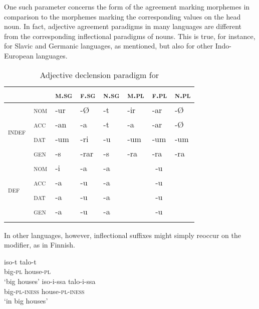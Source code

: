 One such parameter concerns the form of the agreement marking morphemes in comparison to the morphemes marking the corresponding values on the head noun. In fact, adjective agreement paradigms in many languages are different from the corresponding inflectional paradigms of nouns. This is true, for instance, for Slavic and Germanic languages, as mentioned, but also for other Indo-European languages. 
\begin{table}
\begin{tabular}{l l  l l l  l l l}
\lsptoprule
		&		&\textsc{m.sg}&\textsc{f.sg}&\textsc{n.sg}&\textsc{m.pl}&\textsc{f.pl}&\textsc{n.pl}\\
\midrule
		\multirow{4}{*}{\textsc{indef}} 	
		&\textsc{nom}	&-ur		&-Ø		&-t		&-ir		&-ar		&-Ø \\
		&\textsc{acc}	&-an		&-a		&-t		&-a		&-ar		&-Ø \\
		&\textsc{dat}	&-um	&-ri		&-u		&-um	&-um	&-um\\
		&\textsc{gen}	&-s		&-rar		&-s		&-ra		&-ra		&-ra\\
\midrule
		\multirow{4}{*}{\textsc{def}}	
		&\textsc{nom}	&-i		&-a		&-a		&\multicolumn{3}{c}{-u}\\
		&\textsc{acc}	&-a		&-u		&-a		&\multicolumn{3}{c}{-u}\\
		&\textsc{dat}	&-a		&-u		&-a		&\multicolumn{3}{c}{-u}\\
		&\textsc{gen}	&-a		&-u		&-a		&\multicolumn{3}{c}{-u}\\
\lspbottomrule
\end{tabular}
\caption[Adjective paradigm for \textsc{Icelandic}]{Adjective declension paradigm for }
\label{icelandic agr}
\end{table}
In other languages, however, inflectional suffixes might simply reoccur on the modifier, as in Finnish.
\begin{exe}
\ex 
\label{finnish agr.}
\begin{xlist}
\ex
\gll 	iso-t		talo-t\\
	big-\textsc{pl}	house-\textsc{pl}\\
\glt	‘big houses’
\ex
\gll 	iso-i-ssa		talo-i-ssa\\
	big-\textsc{pl}-\textsc{iness} house-\textsc{pl}-\textsc{iness}\\
\glt	‘in big houses’
\end{xlist}
\end{exe}
